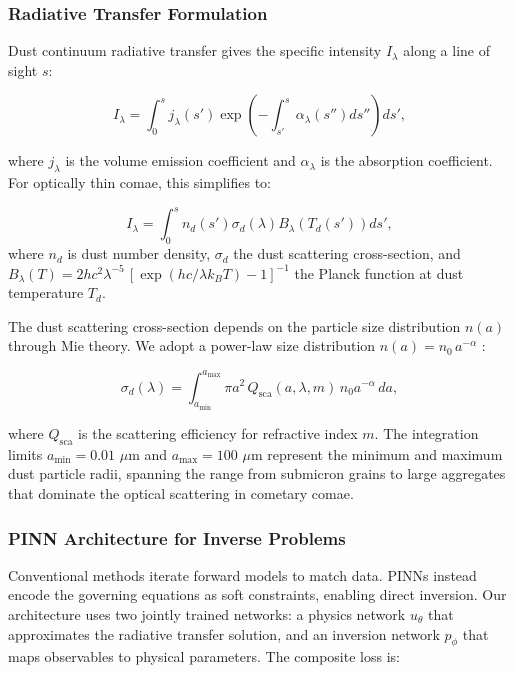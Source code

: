 \documentclass[preprint2]{aastex631}
\begin{document}
\subsubsection{Radiative Transfer Formulation}

Dust continuum radiative transfer gives the specific intensity $I_\lambda$ along a line of sight $s$:

\begin{equation}\label{eq:rt_dust}
I_\lambda = \int_{0}^{s} j_\lambda(s') \exp\left(-\int_{s'}^{s} \alpha_\lambda(s'') ds''\right) ds',
\end{equation}

where $j_\lambda$ is the volume emission coefficient and $\alpha_\lambda$ is the absorption coefficient. For optically thin comae, this simplifies to:

\begin{equation}\label{eq:thin_dust}
I_\lambda = \int_{0}^{s} n_d(s') \sigma_d(\lambda) B_\lambda(T_d(s')) ds',
\end{equation}
where $n_d$ is dust number density, $\sigma_d$ the dust scattering cross-section, and $B_\lambda(T) = 2hc^2\lambda^{-5}\,[\exp(hc/\lambda k_B T) - 1]^{-1}$ the Planck function at dust temperature $T_d$.

The dust scattering cross-section depends on the particle size distribution $n(a)$ through Mie theory. We adopt a power-law size distribution $n(a) = n_0\, a^{-\alpha}$ \citep{kolokolova04}:

\begin{equation}\label{eq:mie_sigma}
\sigma_d(\lambda) = \int_{a_{\min}}^{a_{\max}} \pi a^2 \, Q_{\text{sca}}(a, \lambda, m) \, n_0 a^{-\alpha} \, da,
\end{equation}

where $Q_{\text{sca}}$ is the scattering efficiency for refractive index $m$. The integration limits $a_{\min} = 0.01$ $\mu$m and $a_{\max} = 100$ $\mu$m represent the minimum and maximum dust particle radii, spanning the range from submicron grains to large aggregates that dominate the optical scattering in cometary comae.

\subsubsection{PINN Architecture for Inverse Problems}

Conventional methods iterate forward models to match data. PINNs instead encode the governing equations as soft constraints, enabling direct inversion. Our architecture uses two jointly trained networks: a physics network $u_\theta$ that approximates the radiative transfer solution, and an inversion network $p_\phi$ that maps observables to physical parameters. The composite loss is:
\end{document}
